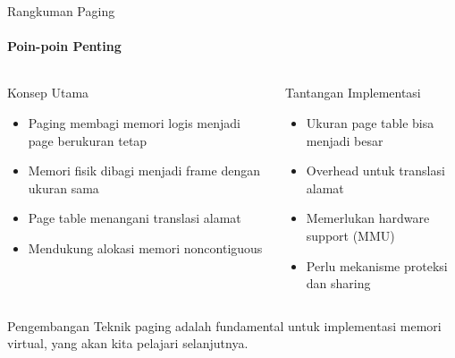 \documentclass[10pt,aspectratio=169]{beamer}
\begin{document}
\begin{frame}{Rangkuman Paging}
    \framesubtitle{Poin-poin Penting}
    
    \begin{columns}[T]
            \begin{block}{Konsep Utama}
                \begin{itemize}
                    \item Paging membagi memori logis menjadi page berukuran tetap
                    \item Memori fisik dibagi menjadi frame dengan ukuran sama
                    \item Page table menangani translasi alamat
                    \item Mendukung alokasi memori noncontiguous
                \end{itemize}
            \end{block}
            
            \begin{alertblock}{Tantangan Implementasi}
                \begin{itemize}
                    \item Ukuran page table bisa menjadi besar
                    \item Overhead untuk translasi alamat
                    \item Memerlukan hardware support (MMU)
                    \item Perlu mekanisme proteksi dan sharing
                \end{itemize}
            \end{alertblock}
    \end{columns}
    
    \begin{block}{Pengembangan}
        Teknik paging adalah fundamental untuk implementasi memori virtual, yang akan kita pelajari selanjutnya.
    \end{block}
\end{frame}

\backmatter %
\end{document}
